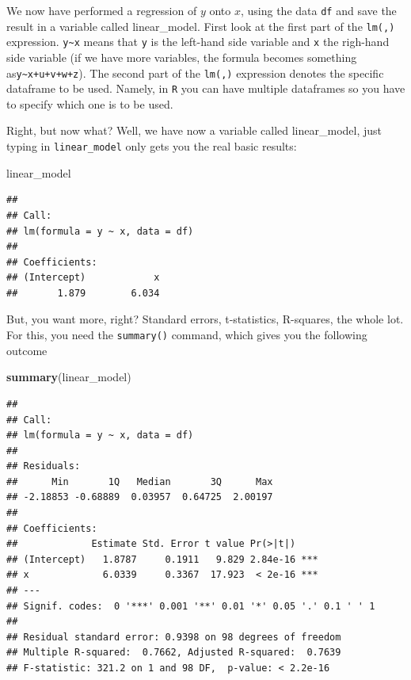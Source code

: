 \documentclass[]{article}
\newenvironment{Shaded}{\begin{snugshade}}{\end{snugshade}}
\newcommand{\KeywordTok}[1]{\textcolor[rgb]{0.13,0.29,0.53}{\textbf{#1}}}
\newcommand{\NormalTok}[1]{#1}
\theoremstyle{definition}
\theoremstyle{definition}
\theoremstyle{definition}
\theoremstyle{remark}
\begin{document}
We now have performed a regression of \(y\) onto \(x\), using the data
\texttt{df} and save the result in a variable called linear\_model.
First look at the first part of the \texttt{lm(,)} expression.
\texttt{y\textasciitilde{}x} means that \texttt{y} is the left-hand side
variable and \texttt{x} the righ-hand side variable (if we have more
variables, the formula becomes something
as\texttt{y\textasciitilde{}x+u+v+w+z}). The second part of the
\texttt{lm(,)} expression denotes the specific dataframe to be used.
Namely, in \texttt{R} you can have multiple dataframes so you have to
specify which one is to be used.

Right, but now what? Well, we have now a variable called linear\_model,
just typing in \texttt{linear\_model} only gets you the real basic
results:

\begin{Shaded}
\begin{Highlighting}[]
\NormalTok{linear_model}
\end{Highlighting}
\end{Shaded}

\begin{verbatim}
## 
## Call:
## lm(formula = y ~ x, data = df)
## 
## Coefficients:
## (Intercept)            x  
##       1.879        6.034
\end{verbatim}

But, you want more, right? Standard errors, t-statistics, R-squares, the
whole lot. For this, you need the \texttt{summary()} command, which
gives you the following outcome

\begin{Shaded}
\begin{Highlighting}[]
\KeywordTok{summary}\NormalTok{(linear_model)}
\end{Highlighting}
\end{Shaded}

\begin{verbatim}
## 
## Call:
## lm(formula = y ~ x, data = df)
## 
## Residuals:
##      Min       1Q   Median       3Q      Max 
## -2.18853 -0.68889  0.03957  0.64725  2.00197 
## 
## Coefficients:
##             Estimate Std. Error t value Pr(>|t|)    
## (Intercept)   1.8787     0.1911   9.829 2.84e-16 ***
## x             6.0339     0.3367  17.923  < 2e-16 ***
## ---
## Signif. codes:  0 '***' 0.001 '**' 0.01 '*' 0.05 '.' 0.1 ' ' 1
## 
## Residual standard error: 0.9398 on 98 degrees of freedom
## Multiple R-squared:  0.7662, Adjusted R-squared:  0.7639 
## F-statistic: 321.2 on 1 and 98 DF,  p-value: < 2.2e-16
\end{verbatim}
\end{document}

